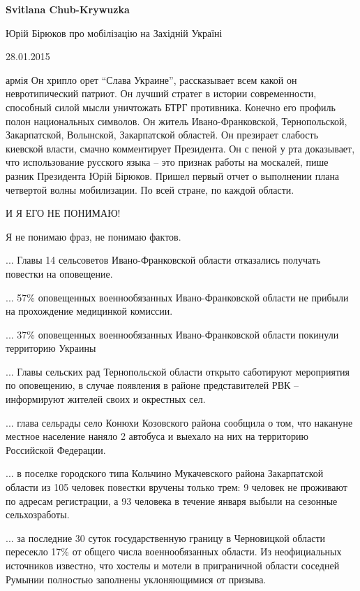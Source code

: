 \begin{itemize}
\begin{itemize}
 
\textbf{Svitlana Chub-Krywuzka} 

Юрій Бірюков про мобілізацію на Західній Україні

28.01.2015


армія Он хрипло орет \enquote{Слава Украине}, рассказывает всем какой он
невротипический патриот. Он лучший стратег в истории современности, способный
силой мысли уничтожать БТРГ противника. Конечно его профиль полон национальных
символов. Он житель Ивано-Франковской, Тернопольской, Закарпатской, Волынской,
Закарпатской областей. Он презирает слабость киевской власти, смачно
комментирует Президента. Он с пеной у рта доказывает, что использование
русского языка – это признак работы на москалей, пише разник Президента Юрій
Бірюков. Пришел первый отчет о выполнении плана четвертой волны мобилизации. По
всей стране, по каждой области.

И Я ЕГО НЕ ПОНИМАЮ!

Я не понимаю фраз, не понимаю фактов.

... Главы 14 сельсоветов Ивано-Франковской области отказались получать повестки на оповещение.

... 57\% оповещенных военнообязанных Ивано-Франковской области не прибыли на прохождение медицинкой комиссии.

... 37\% оповещенных военнообязанных Ивано-Франковской области покинули территорию Украины

... Главы сельских рад Тернопольской области открыто саботируют мероприятия по
оповещению, в случае появления в районе представителей РВК – информируют
жителей своих и окрестных сел.

... глава сельрады село Конюхи Козовского района сообщила о том, что накануне
местное население наняло 2 автобуса и выехало на них на территорию Российской
Федерации.

... в поселке городского типа Кольчино Мукачевского района Закарпатской области
из 105 человек повестки вручены только трем: 9 человек не проживают по адресам
регистрации, а 93 человека в течение января выбыли на сезонные сельхозработы.

... за последние 30 суток государственную границу в Черновицкой области пересекло
17\% от общего числа военнообязанных области. Из неофициальных источников
известно, что хостелы и мотели в приграничной области соседней Румынии
полностью заполнены уклоняющимися от призыва.


\end{itemize}
\end{itemize}
